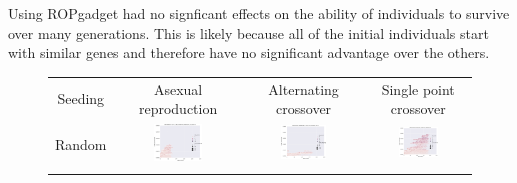 \documentclass{article}
\begin{document}
Using ROPgadget had no signficant effects on the ability of individuals to survive over many generations. This is likely because all of the initial individuals start with similar genes and therefore have no significant advantage over the others.

\pagestyle{empty}
\begin{landscape}
\begin{figure}[t]
\begin{center}
\begin{tabular}{c c c c}
    Seeding & Asexual reproduction & Alternating crossover & Single point crossover \\
    Random & \includegraphics[align=c,width=0.42\textwidth]{gd/e1/1} & \includegraphics[align=c,width=0.42\textwidth]{gd/e1/2} & \includegraphics[align=c,width=0.42\textwidth]{gd/e1/3} \\
    & & & \\

\end{tabular}
\end{center}
\end{figure}
\end{landscape}
\end{document}

